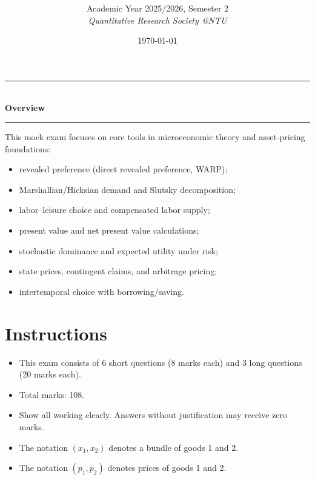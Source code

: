 \documentclass[12pt]{article}
\title{
\CourseCode \CourseName \\[0.3em]
\large \DocType
}
\author{
  Academic Year 2025/2026, Semester 2 \\[0.25em]
  \textit{Quantitative Research Society @NTU}
}
\date{\today}
\begin{document}
\maketitle
\thispagestyle{plainfirst}
\pagestyle{main}
\bigskip

\begin{center}
  \rule{0.8\textwidth}{0.4pt}\\[4pt]
  \textbf{Overview}\\[2pt]
  \rule{0.8\textwidth}{0.4pt}
\end{center}

\noindent
This mock exam focuses on core tools in microeconomic theory and asset-pricing foundations:
\begin{itemize}[leftmargin=*]
  \item revealed preference (direct revealed preference, WARP);
  \item Marshallian/Hicksian demand and Slutsky decomposition;
  \item labor--leisure choice and compensated labor supply;
  \item present value and net present value calculations;
  \item stochastic dominance and expected utility under risk;
  \item state prices, contingent claims, and arbitrage pricing;
  \item intertemporal choice with borrowing/saving.
\end{itemize}

\section*{Instructions}
\begin{itemize}
\item This exam consists of 6 short questions (8 marks each) and 3 long questions (20 marks each).
\item Total marks: 108.
\item Show all working clearly. Answers without justification may receive zero marks.
\item The notation $(x_1, x_2)$ denotes a bundle of goods 1 and 2.
\item The notation $(p_1, p_2)$ denotes prices of goods 1 and 2.
\end{itemize}

\bigskip
\end{document}
